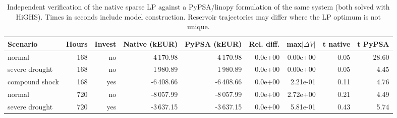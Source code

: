\begin{table}[htbp]
\centering
\footnotesize
\caption{Independent verification of the native sparse LP against a PyPSA/linopy formulation of the same system (both solved with HiGHS). Times in seconds include model construction. Reservoir trajectories may differ where the LP optimum is not unique.}
\label{tab:validation}
\begin{adjustbox}{max width=\linewidth}
\begin{tabular}{lrrrrrrrr}
\toprule
Scenario & Hours & Invest & Native (kEUR) & PyPSA (kEUR) & Rel. diff. & max$|\Delta V|$ & t native & t PyPSA \\
\midrule
normal & 168 & no & -4\,170.98 & -4\,170.98 & 0.0e+00 & 0.00e+00 & 0.05 & 28.60 \\
severe drought & 168 & no & 1\,980.89 & 1\,980.89 & 0.0e+00 & 0.00e+00 & 0.05 & 4.45 \\
compound shock & 168 & yes & -6\,408.66 & -6\,408.66 & 0.0e+00 & 2.21e-01 & 0.11 & 4.76 \\
normal & 720 & no & -8\,057.99 & -8\,057.99 & 0.0e+00 & 2.72e+00 & 0.21 & 4.49 \\
severe drought & 720 & yes & -3\,637.15 & -3\,637.15 & 0.0e+00 & 5.81e-01 & 0.43 & 5.74 \\
\bottomrule
\end{tabular}
\end{adjustbox}
\end{table}
